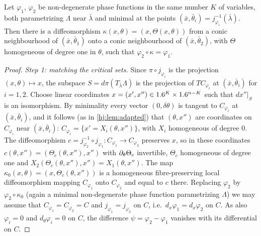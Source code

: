 \begin{theorem}\label{hj:thm:equivalence}
  Let $\varphi_1$, $\varphi_2$ be non-degenerate phase functions in the same
  number $K$ of variables, both parametrizing $\Lambda$ near $\bar\lambda$ and
  minimal at the points $(\bar x,\bar\theta_i)=j_{\varphi_i}^{-1}(\bar\lambda)$.
  Then there is a diffeomorphism $\kappa(x,\theta)=(x,\Theta(x,\theta))$ from a
  conic neighbourhood of $(\bar x,\bar\theta_1)$ onto a conic neighbourhood of
  $(\bar x,\bar\theta_2)$, with $\Theta$ homogeneous of degree one in $\theta$,
  such that $\varphi_2\circ\kappa=\varphi_1$.
\end{theorem}
\begin{proof}
  \emph{Step 1: matching the critical sets.}  Since $\pi\circ j_{\varphi_i}$ is
  the projection $(x,\theta)\mapsto x$, the subspace
  $S=d\pi(T_{\bar\lambda}\Lambda)$ is the projection of $T C_{\varphi_i}$ at
  $(\bar x,\bar\theta_i)$ for $i=1,2$.  Choose linear coordinates
  $x=(x',x'')\in1.6^K\times1.6^{n-K}$ such that $dx''|_S$ is an isomorphism.  By
  minimality every vector $(0,\delta\theta)$ is tangent to $C_{\varphi_i}$ at
  $(\bar x,\bar\theta_i)$, and it follows (as in \cref{hj:lem:adapted}) that
  $(\theta,x'')$ are coordinates on $C_{\varphi_i}$ near
  $(\bar x,\bar\theta_i)$: $C_{\varphi_i}=\{x'=X_i(\theta,x'')\}$, with $X_i$
  homogeneous of degree $0$.  The diffeomorphism
  $c=j_{\varphi_2}^{-1}\circ j_{\varphi_1}:C_{\varphi_1}\to C_{\varphi_2}$
  preserves $x$, so in these coordinates
  $c(\theta,x'')=(\Theta_c(\theta,x''),x'')$ with $\partial_\theta\Theta_c$ invertible,
  $\Theta_c$ homogeneous of degree one and
  $X_2(\Theta_c(\theta,x''),x'')=X_1(\theta,x'')$.  The map
  $\kappa_0(x,\theta)=(x,\Theta_c(\theta,x''))$ is a homogeneous fibre-preserving
  local diffeomorphism mapping $C_{\varphi_1}$ onto $C_{\varphi_2}$ and equal to
  $c$ there.  Replacing $\varphi_2$ by $\varphi_2\circ\kappa_0$ (again a minimal
  non-degenerate phase function parametrizing $\Lambda$) we may assume that
  $C_{\varphi_1}=C_{\varphi_2}=C$ and $j_{\varphi_1}=j_{\varphi_2}$ on $C$, i.e.\
  $d_x\varphi_1=d_x\varphi_2$ on $C$.  As also $\varphi_i=0$ and
  $d_\theta\varphi_i=0$ on $C$, the difference $\psi=\varphi_2-\varphi_1$ vanishes
  with its differential on $C$.


\end{proof}
